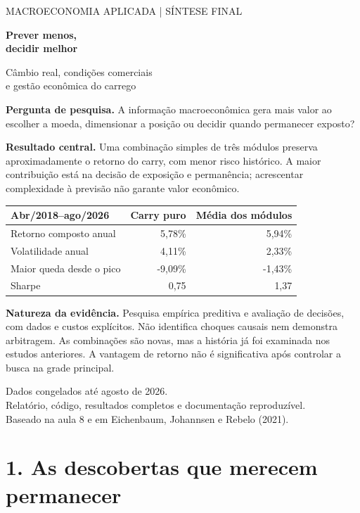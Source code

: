 \documentclass[11pt,a4paper]{article}
\begin{document}
\thispagestyle{empty}
{\large\color{navy}MACROECONOMIA APLICADA \quad | \quad SÍNTESE FINAL}
\vspace{1.3cm}

{\Huge\bfseries\color{navy}Prever menos,\\[6pt]decidir melhor}
\vspace{.6cm}

{\Large Câmbio real, condições comerciais\\e gestão econômica do carrego}
\vspace{.8cm}

\textbf{Pergunta de pesquisa.} A informação macroeconômica gera mais valor ao escolher a moeda, dimensionar a posição ou decidir quando permanecer exposto?

\textbf{Resultado central.} Uma combinação simples de três módulos preserva aproximadamente o retorno do carry, com menor risco histórico. A maior contribuição está na decisão de exposição e permanência; acrescentar complexidade à previsão não garante valor econômico.
\vspace{.5cm}
\small\begin{center}\begin{tabular}{lrr}\toprule Abr/2018--ago/2026 & Carry puro & Média dos módulos\\\midrule 
Retorno composto anual & 5,78\% & 5,94\%\\
Volatilidade anual & 4,11\% & 2,33\%\\
Maior queda desde o pico & -9,09\% & -1,43\%\\
Sharpe & 0,75 & 1,37\\\bottomrule\end{tabular}\end{center}\normalsize

\vspace{.5cm}
\textbf{Natureza da evidência.} Pesquisa empírica preditiva e avaliação de decisões, com dados e custos explícitos. Não identifica choques causais nem demonstra arbitragem. As combinações são novas, mas a história já foi examinada nos estudos anteriores. A vantagem de retorno não é significativa após controlar a busca na grade principal.

\vfill
Dados congelados até agosto de 2026.\\
Relatório, código, resultados completos e documentação reproduzível.\\
Baseado na aula 8 e em Eichenbaum, Johannsen e Rebelo (2021).

\clearpage
\section*{1. As descobertas que merecem permanecer}
\end{document}
